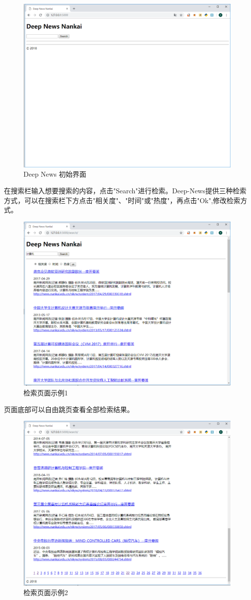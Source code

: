 \documentclass[12pt]{article}
\begin{document}
		\begin{figure}[htb]
			\centering
			\includegraphics[width=0.6\linewidth]{screenshot003}
			\caption[Deep News 初始界面]{Deep News 初始界面}
			\label{Deep News 初始界面}
		\end{figure}
		
		\newpage
		
		在搜索栏输入想要搜索的内容，点击"Search"进行检索。Deep-News提供三种检索方式，可以在搜索栏下方点击"相关度"、"时间"或"热度"，再点击"Ok",修改检索方式。
		
		\begin{figure}[htb]
			\centering
			\includegraphics[width=0.8\linewidth]{screenshot004}
			\caption[检索页面示例1]{检索页面示例1}
			\label{检索页面示例1}
		\end{figure}
		
		\newpage
		
		页面底部可以自由跳页查看全部检索结果。
		
		\begin{figure}[htb]
			\centering
			\includegraphics[width=0.5\linewidth]{screenshot005}
			\caption[检索页面示例2]{检索页面示例2}
			\label{检索页面示例2}
		\end{figure}
		
\end{document}
